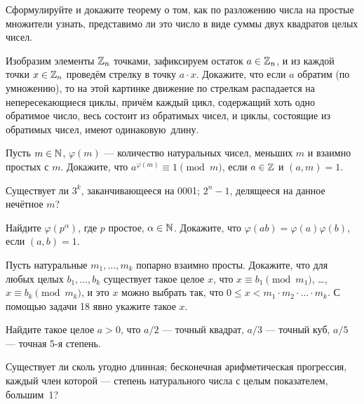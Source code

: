 \documentclass[a4paper, 11pt]{article}
\newcommand{\del}{\mathrel{\raisebox{-.3 ex}{${\vdots}$}}}
\begin{document}
 Сформулируйте и докажите теорему о том, 
как по разложению числа на простые множители узнать, представимо ли это число 
в виде суммы двух квадратов целых чисел. 


Изобразим элементы $\mathbb{Z}_n$ точками, зафиксируем
остаток $a\in\mathbb{Z}_n$, и из каждой точки
$x\in\mathbb{Z}_n$ провед\"ем стрелку в точку $a\cdot x$. Докажите, что если $a$
обратим (по умножению), то на этой картинке движение по стрелкам распадается
на непересекающиеся циклы, причём каждый цикл, содержащий хоть одно
обратимое число, весь состоит из обратимых чисел, и циклы,
состоящие из обратимых чисел, имеют одинаковую~длину.

Пусть $m\in\mathbb{N}$,
$\varphi(m)$ --- количество натуральных чисел, меньших $m$ и взаимно
простых с $m$.  Докажите, что $a^{\varphi(m)}\equiv1\!\pmod{m}$,
если $a\in\mathbb{Z}$ и $(a,m)=1$.


Существует ли  $3^k$, заканчивающееся на 0001;
 $2^n-1$, делящееся на данное нечётное $m$?

   Найдите $\varphi({p}^{\alpha})$, где $p$ простое, $\alpha\in\mathbb{N}$.  Докажите, что $\varphi(ab)=\varphi(a)\varphi(b)$, если $(a,b)=1$.

 Пусть натуральные $m_1, \dots, m_k$ попарно взаимно просты.
Докажите, что для любых целых $b_1,\dots,b_k$ существует такое
целое $x$, что
$x\equiv b_1\!\pmod{m_1}$, \dots,
$x\equiv b_k\!\pmod{m_k}$,
и это $x$ можно выбрать так, что
$0\leq x< m_1\cdot m_2\cdot\ldots\cdot m_k$.
 С помощью задачи 18 явно укажите такое $x$.

Найдите такое целое $a>0$, что $a/2$ --- точный квадрат, $a/3$ --- точный куб, $a/5$ --- точная 5-я степень.


Существует ли
сколь угодно длинная;
бесконечная арифметическая прогрессия, каждый член которой --- степень
натурального числа с целым показателем, большим~1?



\end{document}
